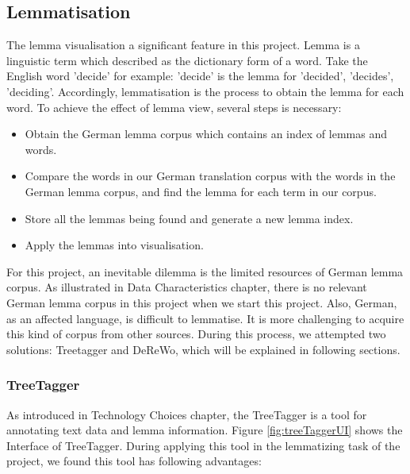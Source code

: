 \subsection{Lemmatisation}

The lemma visualisation a significant feature in this project. Lemma is a linguistic term which described as the dictionary form of a word. Take the English word 'decide' for example: 'decide' is the lemma for 'decided', 'decides', 'deciding'. Accordingly, lemmatisation is the process to obtain the lemma for each word. To achieve the effect of lemma view, several steps is necessary:
\begin{itemize}
	\item \textbf{} Obtain the German lemma corpus which contains an index of lemmas and words.
	\item \textbf{} Compare the words in our German translation corpus with the words in the German lemma corpus, and find the lemma for each term in our corpus.
	\item \textbf{} Store all the lemmas being found and generate a new lemma index.
	\item \textbf{} Apply the lemmas into visualisation.
\end{itemize}
For this project, an inevitable dilemma is the limited resources of German lemma corpus. As illustrated in Data Characteristics chapter, there is no relevant German lemma corpus in this project when we start this project. Also, German, as an affected language, is difficult to lemmatise. It is more challenging to acquire this kind of corpus from other sources. During this process, we attempted two solutions: Treetagger and DeReWo, which will be explained in following sections.

\subsubsection{TreeTagger}

As introduced in Technology Choices chapter, the TreeTagger is a tool for annotating text data and lemma information. Figure \ref{fig:treeTaggerUI} shows the Interface of TreeTagger. During applying this tool in the lemmatizing task of the project, we found this tool has following advantages:


